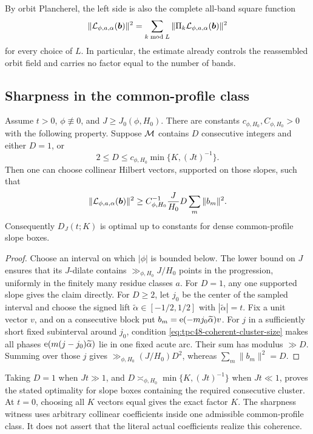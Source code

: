 By orbit Plancherel, the left side is also the complete all-band square
function
\begin{equation}
 \|\mathcal L_{\phi,a,\alpha}(\bm b)\|^2
 =\sum_{k\bmod L}\|\Pi_k
 \mathcal L_{\phi,a,\alpha}(\bm b)\|^2
 \label{eq:tpc48-large-sieve-all-band}
\end{equation}
for every choice of \(L\).  In particular, the estimate already
controls the reassembled orbit field and carries no factor equal to the
number of bands.

\subsection{Sharpness in the common-profile class}

\begin{proposition}
\label{prop:tpc48-large-sieve-sharpness}
Assume \(t>0\), \(\phi\not\equiv0\), and
\(J\ge J_0(\phi,H_0)\).  There are constants
\(c_{\phi,H_0},C_{\phi,H_0}>0\) with the following property.  Suppose
\(\mathcal M\) contains \(D\) consecutive integers and either \(D=1\), or
\begin{equation}
 2\le D\le c_{\phi,H_0}\min\{K,(Jt)^{-1}\}.
 \label{eq:tpc48-coherent-cluster-size}
\end{equation}
Then one can choose collinear Hilbert vectors, supported on those
slopes, such that
\begin{equation}
 \|\mathcal L_{\phi,a,\alpha}(\bm b)\|^2
 \ge C_{\phi,H_0}^{-1}\frac{J}{H_0}D
 \sum_m\|b_m\|^2.
 \label{eq:tpc48-cluster-lower-bound}
\end{equation}
Consequently \(D_J(t;K)\) is optimal up to constants for dense
common-profile slope boxes.
\end{proposition}

\begin{proof}
Choose an interval on which \(|\phi|\) is bounded below.  The lower
bound on \(J\) ensures that its \(J\)-dilate contains
\(\gg_{\phi,H_0}J/H_0\) points in the progression, uniformly in the
finitely many residue classes \(a\).  For \(D=1\), any one supported
slope gives the claim directly.  For \(D\ge2\), let \(j_0\) be the
center of the sampled interval and choose the signed lift
\(\widetilde\alpha\in[-1/2,1/2]\) with
\(|\widetilde\alpha|=t\).  Fix a unit vector \(v\), and on a
consecutive block put
\(b_m=\mathrm e(-mj_0\widetilde\alpha)v\).  For \(j\) in a sufficiently
short fixed subinterval around \(j_0\), condition
\eqref{eq:tpc48-coherent-cluster-size} makes all phases
\(\mathrm e(m(j-j_0)\widetilde\alpha)\) lie in one fixed acute arc.  Their sum has
modulus \(\gg D\).  Summing over those \(j\) gives
\(\gg_{\phi,H_0}(J/H_0)D^2\), whereas
\(\sum_m\|b_m\|^2=D\).
\end{proof}

Taking \(D=1\) when \(Jt\gg1\), and
\(D\asymp_{\phi,H_0}\min\{K,(Jt)^{-1}\}\) when \(Jt\ll1\), proves the
stated optimality for slope boxes containing the required consecutive
cluster.  At \(t=0\), choosing all \(K\) vectors equal gives the exact
factor \(K\).  The sharpness witness uses arbitrary collinear coefficients
inside one admissible common-profile class.  It does not assert that
the literal actual coefficients realize this coherence.
